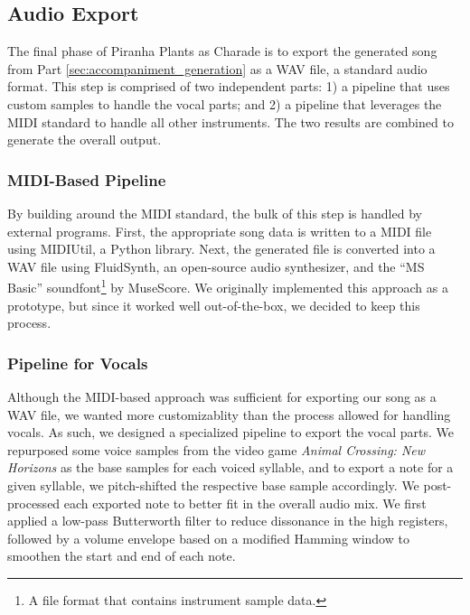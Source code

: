 \subsection{Audio Export}
\label{sec:audio_export}

The final phase of Piranha Plants as Charade is to export the generated song from Part \ref{sec:accompaniment_generation} as a WAV file, a standard audio format. This step is comprised of two independent parts: 1) a pipeline that uses custom samples to handle the vocal parts; and 2) a pipeline that leverages the MIDI standard to handle all other instruments. The two results are combined to generate the overall output.

\subsubsection{MIDI-Based Pipeline}

By building around the MIDI standard, the bulk of this step is handled by external programs. First, the appropriate song data is written to a MIDI file using MIDIUtil, a Python library. Next, the generated file is converted into a WAV file using FluidSynth, an open-source audio synthesizer, and the ``MS Basic'' soundfont\footnote{A file format that contains instrument sample data.} by MuseScore. We originally implemented this approach as a prototype, but since it worked well out-of-the-box, we decided to keep this process.

\subsubsection{Pipeline for Vocals}

Although the MIDI-based approach was sufficient for exporting our song as a WAV file, we wanted more customizablity than the process allowed for handling vocals. As such, we designed a specialized pipeline to export the vocal parts. We repurposed some voice samples from the video game \emph{Animal Crossing: New Horizons} as the base samples for each voiced syllable, and to export a note for a given syllable, we pitch-shifted the respective base sample accordingly. We post-processed each exported note to better fit in the overall audio mix. We first applied a low-pass Butterworth filter to reduce dissonance in the high registers, followed by a volume envelope based on a modified Hamming window to smoothen the start and end of each note.

